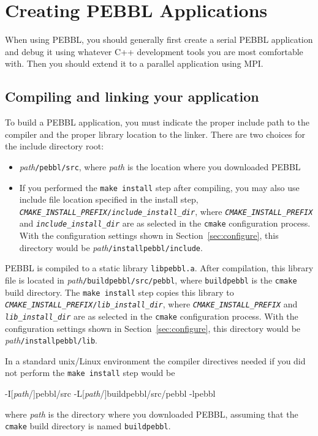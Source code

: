 \section{Creating PEBBL Applications}
When using PEBBL, you should generally first create a serial PEBBL
application and debug it using whatever C++ development tools
you are most comfortable with.  Then you should extend it to a
parallel application using MPI.

\subsection{Compiling and linking your application}
To build a PEBBL application, you must indicate the proper include path to the
compiler and the proper library location to the linker.  There are two choices
for the include directory root:
\begin{itemize}
\item \emph{path}\texttt{/pebbl/src}, where \emph{path} is the location where
you downloaded PEBBL
\item If you performed the \texttt{make install} step after compiling, you may
also use include file location specified in the install step,
\texttt{\emph{CMAKE\_INSTALL\_PREFIX}/\emph{include\_install\_dir}}, where
\texttt{\emph{CMAKE\_INSTALL\_PREFIX}} and
\texttt{\emph{include\_install\_dir}} are as selected in the \texttt{cmake}
configuration process.  With the configuration settings shown in
Section~\ref{sec:configure}, this directory would be
\emph{path}\texttt{/installpebbl/include}.
\end{itemize}
PEBBL is compiled to a static library \texttt{libpebbl.a}.   After
compilation, this library file is located in
\emph{path}\texttt{/buildpebbl/src/pebbl}, where \texttt{buildpebbl} is the
\texttt{cmake} build directory.  The \texttt{make install} step copies this
library to \texttt{\emph{CMAKE\_INSTALL\_PREFIX}/\emph{lib\_install\_dir}},
where \texttt{\emph{CMAKE\_INSTALL\_PREFIX}} and
\texttt{\emph{lib\_install\_dir}} are as selected in the \texttt{cmake}
configuration process.  With the configuration settings shown in
Section~\ref{sec:configure}, this directory would be
\emph{path}\texttt{/installpebbl/lib}.

In a standard unix/Linux environment the compiler directives needed if you did
not perform the \texttt{make install} step would be
\begin{codeblock}
-I\textrm{[\emph{path}}/\textrm{]}pebbl/src
-L\textrm{[\emph{path}}/\textrm{]}buildpebbl/src/pebbl -lpebbl
\end{codeblock}
where \emph{path} is the directory where you downloaded PEBBL, assuming that
the \texttt{cmake} build directory is named \texttt{buildpebbl}.

